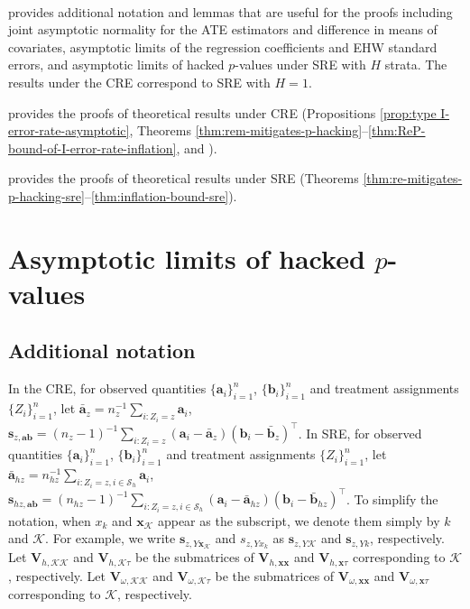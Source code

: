\documentclass[12pt]{article}
\newcommand{\mk}{\mathcal{K}}
\newcommand{\ms}{\mathcal{S}}
\newcommand{\bs}{\boldsymbol}
\def\spacingset#1{\renewcommand{\baselinestretch}{#1}\small\normalsize}
\begin{document}
﻿

 provides additional notation and lemmas that are useful for the proofs including joint asymptotic normality for the ATE estimators and difference in means of covariates, asymptotic limits of the regression coefficients and EHW standard errors, and asymptotic limits of hacked $p$-values under SRE with $H$ strata. The results under the CRE correspond to SRE with $H=1$. 

 provides the proofs of theoretical results under CRE  (Propositions \ref{prop:type I-error-rate-asymptotic}, Theorems \ref{thm:rem-mitigates-p-hacking}--\ref{thm:ReP-bound-of-I-error-rate-inflation}, and ).

 provides the proofs of theoretical results under SRE (Theorems \ref{thm:re-mitigates-p-hacking-sre}--\ref {thm:inflation-bound-sre}).

\section{Asymptotic limits of hacked $p$-values}
\label{sec:hacked-p-value-limits}


\subsection{Additional notation}

In the CRE, for observed quantities $\{\bs{a}_i\}_{i=1}^n$, $\{\bs{b}_i\}_{i=1}^n$ and treatment assignments $\{Z_i\}_{i=1}^n$, let $\bar{\bs{a}}_z =  n_z^{-1}\sum_{i:Z_i=z} \bs{a}_i$, $\bs{s}_{z,\bs{a}\bs{b}} = (n_z-1)^{-1}\sum_{i:Z_i=z}(\bs{a}_i-\bar{\bs{a}}_z)(\bs{b}_i-\bar{\bs{b}}_z)^\top$. 
In SRE, for observed quantities $\{\bs{a}_i\}_{i=1}^n$, $\{\bs{b}_i\}_{i=1}^n$ and treatment assignments $\{Z_i\}_{i=1}^n$, let $\bar{\bs{a}}_{hz} =  n_{hz}^{-1}\sum_{i:Z_i=z, i\in \ms_h} \bs{a}_i$, $\bs{s}_{hz,\bs{a}\bs{b}} = (n_{hz}-1)^{-1}\sum_{i:Z_i=z,i\in \ms_h}(\bs{a}_i-\bar{\bs{a}}_{hz})(\bs{b}_i-\bar{\bs{b}}_{hz})^\top$. To simplify the notation, when $x_{k}$ and $\bs{x}_{\mk}$ appear as the subscript, we denote them simply by $k$ and $\mk$. For example, we write $\bs{s}_{z,Y\bs{x}_{\mk}}$ and $s_{z,Y x_k}$ as $\bs{s}_{z,Y\mk}$ and $\bs{s}_{z,Y k}$, respectively. Let $\bs{V}_{h,\mk\mk}$ and $\bs{V}_{h,\mk\tau}$ be the submatrices of $\bs{V}_{h,\bs{x}\bs{x}}$ and $\bs{V}_{h,\bs{x}\tau}$ corresponding to $\mk$, respectively. Let $\bs{V}_{\omega,\mk\mk}$ and $\bs{V}_{\omega,\mk\tau}$ be the submatrices of $\bs{V}_{\omega,\bs{x}\bs{x}}$ and $\bs{V}_{\omega,\bs{x}\tau}$ corresponding to $\mk$, respectively.
\end{document}
